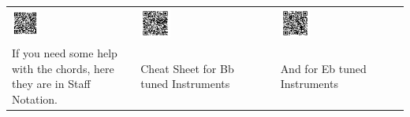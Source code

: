 \begin{tabular}{p{} p{} p{}  p{} p{}}
  \includegraphics[width=0.25\textwidth]{QR_Codes/QR_LuxAeterna_Chords.png}
  &
  &
  \includegraphics[width=0.25\textwidth]{QR_Codes/QR_LuxAeterna_Bb.png}
  &
  &
  \includegraphics[width=0.25\textwidth]{QR_Codes/QR_LuxAeterna_Eb.png}\\                                                     
   If you need some help with the chords, here they are in Staff Notation.
   &
   &
   Cheat Sheet for Bb tuned Instruments
   &
   &
   And for Eb tuned Instruments\\
\end{tabular}